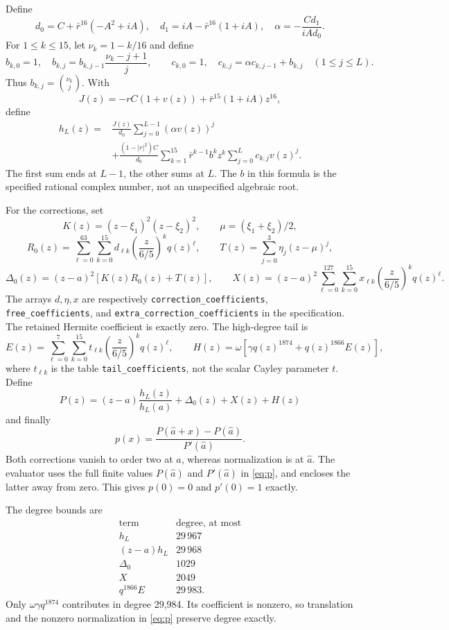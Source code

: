 \documentclass[11pt,a4paper]{article}
\newcommand{\file}[1]{\textnormal{\small\ttfamily\nolinkurl{#1}}}
\newcommand{\astar}{\widehat a}
\begin{document}
Define
\[
 d_0=C+\bar r^{16}(-A^2+iA),\quad
 d_1=iA-\bar r^{16}(1+iA),\quad
 \alpha=-\frac{Cd_1}{iAd_0}.
\]
For $1\le k\le15$, let $\nu_k=1-k/16$ and define
\[
 b_{k,0}=1,\quad b_{k,j}=b_{k,j-1}\frac{\nu_k-j+1}{j},\qquad
 c_{k,0}=1,\quad c_{k,j}=\alpha c_{k,j-1}+b_{k,j}\quad(1\le j\le L).
\]
Thus $b_{k,j}=\binom{\nu_k}{j}$. With
\[
 J(z)=-rC(1+v(z))+\bar r^{15}(1+iA)z^{16},
\]
define
\begin{equation}\label{eq:h}
\begin{split}
 h_L(z)={}&\frac{J(z)}{d_0}\sum_{j=0}^{L-1}(\alpha v(z))^j\\
 &+\frac{(1-|r|^2)C}{d_0}\sum_{k=1}^{15}\bar r^{k-1}b^kz^k
                   \sum_{j=0}^{L}c_{k,j}v(z)^j.
\end{split}
\end{equation}
The first sum ends at $L-1$, the other sums at $L$. The $b$ in this formula
is the specified rational complex number, not an unspecified algebraic root.

For the corrections, set
\[
 K(z)=(z-\xi_1)^2(z-\xi_2)^2,\qquad \mu=(\xi_1+\xi_2)/2,
\]
\[
 R_0(z)=\sum_{\ell=0}^{63}\sum_{k=0}^{15}
 d_{\ell k}\left(\frac z{6/5}\right)^kq(z)^\ell,
 \qquad T(z)=\sum_{j=0}^3\eta_j(z-\mu)^j,
\]
\[
 \Delta_0(z)=(z-a)^2[K(z)R_0(z)+T(z)],\qquad
 X(z)=(z-a)^2\sum_{\ell=0}^{127}\sum_{k=0}^{15}
 x_{\ell k}\left(\frac z{6/5}\right)^kq(z)^\ell.
\]
The arrays $d,\eta,x$ are respectively \file{correction_coefficients},
\file{free_coefficients}, and \file{extra_correction_coefficients} in the
specification. The retained Hermite coefficient is exactly zero.
The high-degree tail is
\[
 E(z)=\sum_{\ell=0}^{7}\sum_{k=0}^{15}
 t_{\ell k}\left(\frac z{6/5}\right)^kq(z)^\ell,
 \qquad H(z)=\omega[\gamma q(z)^{1874}+q(z)^{1866}E(z)],
\]
where $t_{\ell k}$ is the table \file{tail_coefficients}, not the scalar Cayley
parameter $t$. Define
\begin{equation}\label{eq:P}
 P(z)=(z-a)\frac{h_L(z)}{h_L(a)}+\Delta_0(z)+X(z)+H(z)
\end{equation}
and finally
\begin{equation}\label{eq:p}
 \boxed{p(x)=\frac{P(\astar+x)-P(\astar)}{P'(\astar)}.}
\end{equation}
Both corrections vanish to order two at $a$, whereas normalization is at
$\astar$. The evaluator uses the full finite values $P(\astar)$ and
$P'(\astar)$ in \eqref{eq:p}, and encloses the latter away from zero.
This gives $p(0)=0$ and $p'(0)=1$ exactly.

The degree bounds are
\[
\begin{array}{c|r}
\text{term}&\text{degree, at most}\\\hline
 h_L&29\,967\\(z-a)h_L&29\,968\\
 \Delta_0&1029\\X&2049\\q^{1866}E&29\,983.
\end{array}
\]
Only $\omega\gamma q^{1874}$ contributes in degree 29,984. Its coefficient
is nonzero, so translation and the nonzero normalization in \eqref{eq:p}
preserve degree exactly.
\end{document}
